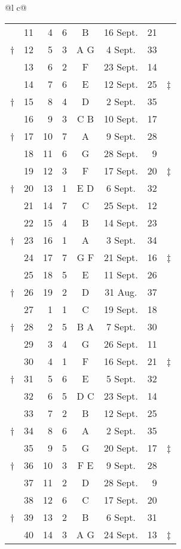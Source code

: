 \begin{tabular}{@{}l c@{}}
\begin{tabular}[t]{@{}r rrcccr l@{}}
~ & 11 &  4 &  6 &  B  & 16 Sept. & 21 \\
† & 12 &  5 &  3 & A G &  4 Sept. & 33 \\
\cmidrule{2-7}
~ & 13 &  6 &  2 &  F  & 23 Sept. & 14 \\
~ & 14 &  7 &  6 &  E  & 12 Sept. & 25 & ‡ \\
† & 15 &  8 &  4 &  D  &  2 Sept. & 35 \\
~ & 16 &  9 &  3 & C B & 10 Sept. & 17 \\
\cmidrule{2-7}
† & 17 & 10 &  7 &  A  &  9 Sept. & 28 \\
~ & 18 & 11 &  6 &  G  & 28 Sept. &  9 & ~\\
~ & 19 & 12 &  3 &  F  & 17 Sept. & 20 & ‡ \\
† & 20 & 13 &  1 & E D &  6 Sept. & 32 \\
\cmidrule{2-7}
~ & 21 & 14 &  7 &  C  & 25 Sept. & 12 \\
~ & 22 & 15 &  4 &  B  & 14 Sept. & 23 \\
† & 23 & 16 &  1 &  A  &  3 Sept. & 34 \\
~ & 24 & 17 &  7 & G F & 21 Sept. & 16 & ‡ \\
\cmidrule{2-7}
~ & 25 & 18 &  5 &  E  & 11 Sept. & 26 \\
† & 26 & 19 &  2 &  D  & 31 Aug.  & 37 & ~ \\
~ & 27 &  1 &  1 &  C  & 19 Sept. & 18 \\
† & 28 &  2 &  5 & B A &  7 Sept. & 30 \\
\cmidrule{2-7}
~ & 29 &  3 &  4 &  G  & 26 Sept. & 11 \\
~ & 30 &  4 &  1 &  F  & 16 Sept. & 21 & ‡ \\
† & 31 &  5 &  6 &  E  &  5 Sept. & 32 \\
~ & 32 &  6 &  5 & D C & 23 Sept. & 14 \\
\cmidrule{2-7}
~ & 33 &  7 &  2 &  B  & 12 Sept. & 25 \\
† & 34 &  8 &  6 &  A  &  2 Sept. & 35 \\
~ & 35 &  9 &  5 &  G  & 20 Sept. & 17 & ‡ \\
† & 36 & 10 &  3 & F E &  9 Sept. & 28 \\
\cmidrule{2-7}
~ & 37 & 11 &  2 &  D  & 28 Sept. &  9 \\
~ & 38 & 12 &  6 &  C  & 17 Sept. & 20 \\
† & 39 & 13 &  2 &  B  &  6 Sept. & 31 \\
~ & 40 & 14 &  3 & A G & 24 Sept. & 13 & ‡ \\
\cmidrule{2-7}

\end{tabular}
\end{tabular}
